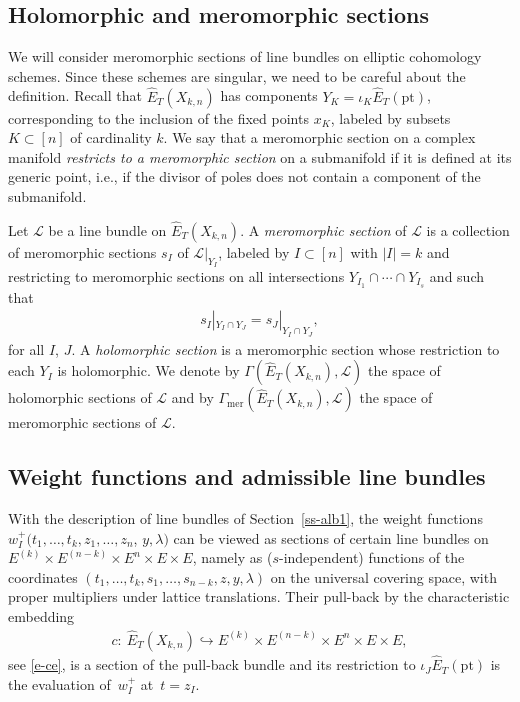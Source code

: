 \documentclass[pdftex]{sigma}
\numberwithin{equation}{section}
\begin{document}
\subsection{Holomorphic and meromorphic sections}\label{ss-ms}
We will consider meromorphic sections of line bundles on elliptic cohomology schemes. Since these schemes are singular, we need to be careful about the definition. Recall that $\hat E_T(X_{k,n})$ has components $Y_K=\iota_K\hat E_T(\mathrm{pt})$, corresponding to the inclusion of the fixed points $x_K$, labeled by subsets $K\subset[n]$ of cardinality $k$. We say that a meromorphic section on a complex manifold {\em restricts to a meromorphic section} on a submanifold if it is defined at its generic point, i.e., if the divisor of poles does not contain a component of the submanifold.
\begin{Definition}\label{def-mero} Let $\mathcal L$ be a line bundle on $\hat E_T(X_{k,n})$. A {\em meromorphic section} of $\mathcal L$ is a collection of meromorphic sections $s_I$ of $\mathcal L|_{Y_I}$, labeled by $I\subset[n]$ with $|I|=k$ and restricting to meromorphic sections on all intersections $Y_{I_1}\cap\cdots\cap Y_{I_s}$ and such that
 \begin{gather*}
 s_I|_{Y_I\cap Y_J}=s_J|_{Y_I\cap Y_J},
 \end{gather*}
for all $I$, $J$. A {\em holomorphic section} is a meromorphic section whose restriction to each $Y_I$ is holomorphic. We denote by $\Gamma(\hat E_T(X_{k,n}),\mathcal L)$ the space of holomorphic sections of $\mathcal L$ and by $\Gamma_{\mathrm{mer}}(\hat E_T(X_{k,n}),\mathcal L)$ the space of meromorphic sections of $\mathcal L$.
\end{Definition}

\subsection{Weight functions and admissible line bundles}
With the description of line bundles of Section~\ref{ss-alb1}, the weight functions $w^+_I(t_1,\dots,t_k,z_1,\dots,z_n$, $y,\lambda)$ can be viewed as sections of certain line bundles on $E^{(k)}\times E^{(n-k)}\times E^n\times E\times E$, namely as ($s$-independent) functions of the coordinates $(t_1,\dots,t_k,s_1,\dots,s_{n-k},z,y,\lambda)$ on the universal covering space, with proper multipliers under lattice translations. Their pull-back by the characteristic embedding
\begin{gather*}
 c \colon \ \hat E_T(X_{k,n})\hookrightarrow E^{(k)}\times E^{(n-k)}\times E^n\times E\times E,
\end{gather*}
see \eqref{e-ce}, is a section of the pull-back bundle and its restriction to $\iota_J\hat E_T(\mathrm{pt})$ is the evaluation of~$w^+_I$ at~$t=z_I$.
\end{document}
